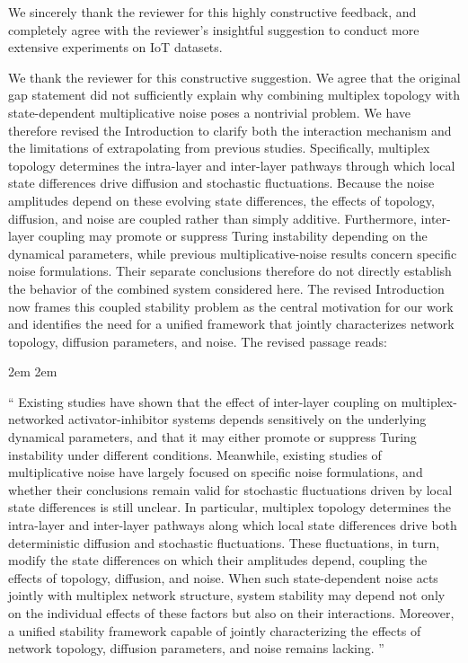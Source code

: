 \documentclass[a4paper,12pt]{article}
\begin{document}
We sincerely thank the reviewer for this highly constructive feedback, and completely agree with the reviewer's insightful suggestion to conduct more extensive experiments on IoT datasets.

We thank the reviewer for this constructive suggestion.
We agree that the original gap statement did not sufficiently explain why combining multiplex topology with state-dependent multiplicative noise poses a nontrivial problem.
We have therefore revised the Introduction to clarify both the interaction mechanism and the limitations of extrapolating from previous studies.
Specifically, multiplex topology determines the intra-layer and inter-layer pathways through which local state differences drive diffusion and stochastic fluctuations.
Because the noise amplitudes depend on these evolving state differences, the effects of topology, diffusion, and noise are coupled rather than simply additive.
Furthermore, inter-layer coupling may promote or suppress Turing instability depending on the dynamical parameters, while previous multiplicative-noise results concern specific noise formulations.
Their separate conclusions therefore do not directly establish the behavior of the combined system considered here.
The revised Introduction now frames this coupled stability problem as the central motivation for our work and identifies the need for a unified framework that jointly characterizes network topology, diffusion parameters, and noise.
The revised passage reads:

\leftskip 2em
\rightskip 2em
\medskip

\noindent
``
Existing studies have shown that the effect of inter-layer coupling on multiplex-networked activator-inhibitor systems depends sensitively on the underlying dynamical parameters, and that it may either promote or suppress Turing instability under different conditions.
Meanwhile, existing studies of multiplicative noise have largely focused on specific noise formulations, and whether their conclusions remain valid for stochastic fluctuations driven by local state differences is still unclear.
In particular, multiplex topology determines the intra-layer and inter-layer pathways along which local state differences drive both deterministic diffusion and stochastic fluctuations. These fluctuations, in turn, modify the state differences on which their amplitudes depend, coupling the effects of topology, diffusion, and noise.
When such state-dependent noise acts jointly with multiplex network structure, system stability may depend not only on the individual effects of these factors but also on their interactions.
Moreover, a unified stability framework capable of jointly characterizing the effects of network topology, diffusion parameters, and noise remains lacking.
''
\end{document}
